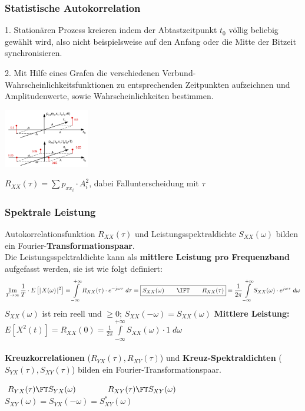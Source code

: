 \subsubsection{Statistische Autokorrelation}
	\parbox{5cm}{1. Stationären Prozess kreieren indem der Abtastzeitpunkt $t_0$ völlig beliebig gewählt wird, also nicht beispielsweise auf den Anfang oder die Mitte der Bitzeit synchronisieren.}
	\hspace{0.25cm}
	\parbox{5cm}{2. Mit Hilfe eines Grafen die verschiedenen Verbund-Wahrscheinlichkeitsfunktionen zu entsprechenden Zeitpunkten aufzeichnen und Amplitudenwerte, sowie Wahrscheinlichkeiten bestimmen.}
	\hspace{0.25cm}
	\parbox{3.75cm}{\includegraphics[width = 3.75cm]{./bilder/07_stat_autokorr}}
	\hspace{0.25cm}
	\parbox{4cm}{$R_{XX}(\tau)=\sum p_{xx_i} \cdot A_i^2$, dabei Fallunterscheidung mit $\tau$}
	

\subsubsection{Spektrale Leistung }
Autokorrelationsfunktion $R_{XX}(\tau)$ und Leistungsspektraldichte $S_{XX}(\omega)$ bilden ein
Fourier-\textbf{Transformationspaar}. \\ Die Leistungsspektraldichte kann als \textbf{mittlere Leistung pro Frequenzband }aufgefasst werden, sie ist
wie folgt definiert:                             
        $$ \lim\limits_{T \rightarrow \infty} \frac{1}{T} \cdot E\left[  \mid\!
        X(\omega) \!\mid^{2}\right] = \int\limits_{-\infty}^{+\infty}
        R_{XX}(\tau) \cdot e^{-j\omega\tau} \; d\tau = \boxed{S_{XX}(\omega)
        \qquad \IFT \qquad R_{XX}(\tau)} = \frac{1}{2\pi}
        \int\limits_{-\infty}^{+\infty}S_{XX}(\omega) \cdot e^{j\omega\tau} \;
        d\omega$$ 
        $S_{XX}(\omega)$ ist rein reell und $\geq 0$; $S_{XX}(-\omega) = S_{XX}(\omega)$ \qquad
        \textbf{Mittlere Leistung:} $ E[X^2(t)] = R_{XX}(0) = \frac{1}{2\pi} \int\limits_{-\infty}^{+\infty}S_{XX}(\omega)\cdot1 \; d\omega $\\ \\
\textbf{Kreuzkorrelationen} ($R_{YX}(\tau), R_{XY}(\tau)$) und \textbf{Kreuz-Spektraldichten} ($S_{YX}(\tau),
S_{XY}(\tau)$) bilden ein Fourier-Transformationspaar.
\begin{center}
	$R_{YX}(\tau) \FT S_{YX}(\omega) \qquad \qquad R_{XY}(\tau) \FT S_{XY}(\omega)$\\
	$S_{XY}(\omega) = S_{YX}(-\omega) = S_{XY}^{\ast}(\omega)$
\end{center}

